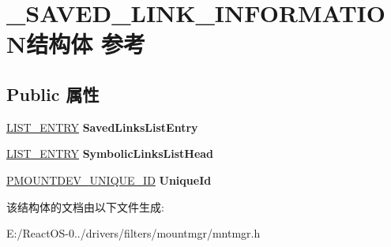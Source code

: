 \hypertarget{struct___s_a_v_e_d___l_i_n_k___i_n_f_o_r_m_a_t_i_o_n}{}\section{\+\_\+\+S\+A\+V\+E\+D\+\_\+\+L\+I\+N\+K\+\_\+\+I\+N\+F\+O\+R\+M\+A\+T\+I\+O\+N结构体 参考}
\label{struct___s_a_v_e_d___l_i_n_k___i_n_f_o_r_m_a_t_i_o_n}
\subsection*{Public 属性}
\begin{DoxyCompactItemize}
\item 
\mbox{\label{struct___s_a_v_e_d___l_i_n_k___i_n_f_o_r_m_a_t_i_o_n_a094a2b72cf0632ec0639637f66a0e0ea}} 
\hyperlink{struct___l_i_s_t___e_n_t_r_y}{L\+I\+S\+T\+\_\+\+E\+N\+T\+RY} {\bfseries Saved\+Links\+List\+Entry}
\item 
\mbox{\label{struct___s_a_v_e_d___l_i_n_k___i_n_f_o_r_m_a_t_i_o_n_aded59d3213ba6ac97307f3efda22dd24}} 
\hyperlink{struct___l_i_s_t___e_n_t_r_y}{L\+I\+S\+T\+\_\+\+E\+N\+T\+RY} {\bfseries Symbolic\+Links\+List\+Head}
\item 
\mbox{\label{struct___s_a_v_e_d___l_i_n_k___i_n_f_o_r_m_a_t_i_o_n_adabcd944a69500569a8e734f1759210a}} 
\hyperlink{struct___m_o_u_n_t_d_e_v___u_n_i_q_u_e___i_d}{P\+M\+O\+U\+N\+T\+D\+E\+V\+\_\+\+U\+N\+I\+Q\+U\+E\+\_\+\+ID} {\bfseries Unique\+Id}
\end{DoxyCompactItemize}


该结构体的文档由以下文件生成\+:\begin{DoxyCompactItemize}
\item 
E\+:/\+React\+O\+S-\/0../drivers/filters/mountmgr/mntmgr.\+h\end{DoxyCompactItemize}
